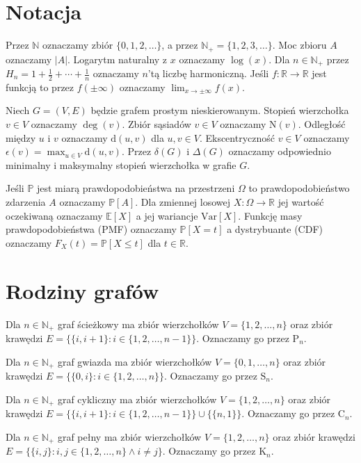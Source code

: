 \section{Notacja}

Przez $\mathbb{N}$ oznaczamy zbiór $\{0,1,2,\dots\}$, a przez $\mathbb{N}_+ = \{1,2,3,\dots\}$. Moc zbioru $A$ oznaczamy $|A|$. Logarytm naturalny z $x$ oznaczamy $\log(x)$. 
Dla $n\in\mathbb{N}_+$ przez $H_n=1+\frac{1}{2}+\cdots+\frac{1}{n}$ oznaczamy $n$'tą liczbę harmoniczną. Jeśli $f:\mathbb{R}\to\mathbb{R}$ jest funkcją to przez $f(\pm\infty)$ oznaczamy $\lim_{x\to\pm\infty} f(x)$.

Niech $G=(V,E)$ będzie grafem prostym nieskierowanym. Stopień wierzchołka $v \in V$ oznaczamy $\deg(v)$. Zbiór sąsiadów $v\in V$ oznaczamy $\mathrm{N}(v)$. Odległość między $u$ i $v$ oznaczamy $\mathrm{d}(u,v)$ dla $u,v\in V$. Ekscentryczność $v\in V$ oznaczamy $\epsilon(v) = \max_{u\in V} \mathrm{d}(u,v)$. Przez $\delta(G)$ i $\Delta(G)$ oznaczamy odpowiednio minimalny i maksymalny stopień wierzchołka w grafie $G$.

Jeśli $\mathbb{P}$ jest miarą prawdopodobieństwa na przestrzeni $\Omega$ to prawdopodobieństwo zdarzenia $A$ oznaczamy $\mathbb{P}[A]$. Dla zmiennej losowej $X:\Omega\to\mathbb{R}$ jej wartość oczekiwaną oznaczamy $\mathbb{E}[X]$ a jej wariancje $\mathrm{Var}[X]$. Funkcję masy prawdopodobieństwa (PMF) oznaczamy $\mathbb{P}[X=t]$ a dystrybuante (CDF) oznaczamy $F_X(t)=\mathbb{P}[X\le t]$ dla $t\in\mathbb{R}$. 


\section{Rodziny grafów}

Dla $n \in \mathbb{N}_+$ graf ścieżkowy ma zbiór wierzchołków $V = \{1, 2, \dots, n\}$ oraz zbiór krawędzi $E = \{\{i, i+1\} : i \in \{1, 2, \dots, n-1\}\}$. Oznaczamy go przez $\mathrm{P}_n$.

Dla $n \in \mathbb{N}_+$ graf gwiazda ma zbiór wierzchołków $V = \{0, 1, \dots, n\}$ oraz zbiór krawędzi $E = \{\{0, i\} : i \in \{1, 2, \dots, n\}\}$. Oznaczamy go przez $\mathrm{S}_n$.

Dla $n \in \mathbb{N}_+$ graf cykliczny ma zbiór wierzchołków $V = \{1, 2, \dots, n\}$ oraz zbiór krawędzi 
$E = \{\{i, i+1\} : i \in \{1, 2, \dots, n-1\}\} \cup \{\{n, 1\}\}$. Oznaczamy go przez $\mathrm{C}_n$.

Dla $n \in \mathbb{N}_+$ graf pełny ma zbiór wierzchołków $V = \{1, 2, \dots, n\}$ oraz zbiór krawędzi $E = \{\{i, j\} : i, j \in \{1, 2, \dots, n\} \land i \ne j\}$. Oznaczamy go przez $\mathrm{K}_n$.


